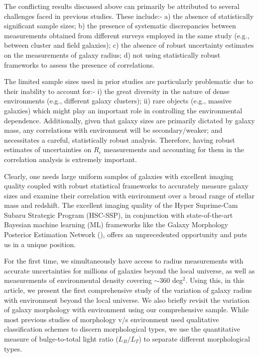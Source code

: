 The conflicting results discussed above can primarily be attributed to several challenges faced in previous studies. These include:- a) the absence of statistically significant sample sizes; b) the presence of systematic discrepancies between measurements obtained from different surveys employed in the same study (e.g., between cluster and field galaxies); c) the absence of robust uncertainty estimates on the measurements of galaxy radius; d) not using statistically robust frameworks to assess the presence of correlations. 

The limited sample sizes used in prior studies are particularly problematic due to their inability to account for:- i) the great diversity in the nature of dense environments (e.g., different galaxy clusters); ii) rare objects (e.g., massive galaxies) which might play an important role in controlling the environmental dependence. Additionally, given that galaxy sizes are primarily dictated by galaxy mass, any correlations with environment will be secondary/weaker; and necessitates a careful, statistically robust analysis. Therefore, having robust estimates of uncertainties on $R_e$ measurements and accounting for them in the correlation analysis is extremely important.  

Clearly, one needs large uniform samples of galaxies with excellent imaging quality coupled with robust statistical frameworks to accurately measure galaxy sizes and examine their correlation with environment over a broad range of stellar mass and redshift. The excellent imaging quality of the Hyper Suprime-Cam Subaru Strategic Program (HSC-SSP), in conjunction with state-of-the-art Bayesian machine learning (ML) frameworks like the Galaxy Morphology Posterior Estimation Network (\gampen{}), offers an unprecedented opportunity and puts us in a unique position. 

For the first time, we simultaneously have access to radius measurements with accurate uncertainties for millions of galaxies beyond the local universe, as well as measurements of environmental density covering $\sim360$ deg$^2$. Using this, in this article, we present the  first comprehensive study of the variation of galaxy radius with environment beyond the local universe. We also briefly revisit the variation of galaxy morphology with environment using our comprehensive sample. While most previous studies of morphology v/s environment used qualitative classification schemes to discern morphological types, we use the quantitative measure of bulge-to-total light ratio ($L_B/L_T$) to separate different morphological types. 

